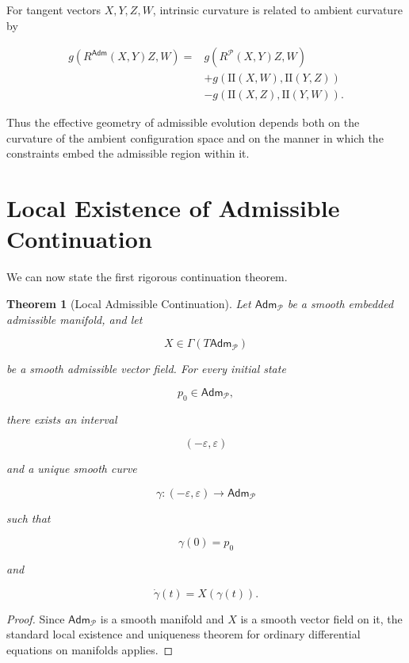 \documentclass[11pt,oneside]{book}
\numberwithin{equation}{chapter}
\theoremstyle{definition}
\theoremstyle{plain}
\newtheorem{theorem}[definition]{Theorem}
\newcommand{\Adm}{\mathsf{Adm}}
\begin{document}
For tangent vectors \(X,Y,Z,W\), intrinsic curvature is related to ambient
curvature by

\[
\begin{aligned}
g
\left(
R^{\Adm}(X,Y)Z,
W
\right)
={}&
g
\left(
R^{\mathcal P}(X,Y)Z,
W
\right)
\\
&
+
g
\left(
\mathrm{II}(X,W),
\mathrm{II}(Y,Z)
\right)
\\
&
-
g
\left(
\mathrm{II}(X,Z),
\mathrm{II}(Y,W)
\right).
\end{aligned}
\]

Thus the effective geometry of admissible evolution depends both on the
curvature of the ambient configuration space and on the manner in which the
constraints embed the admissible region within it.

\section{Local Existence of Admissible Continuation}

We can now state the first rigorous continuation theorem.

\begin{theorem}[Local Admissible Continuation]

Let \(\Adm_{\mathcal P}\) be a smooth embedded admissible manifold, and let

\[
X\in\Gamma(T\Adm_{\mathcal P})
\]

be a smooth admissible vector field. For every initial state

\[
p_0\in\Adm_{\mathcal P},
\]

there exists an interval

\[
(-\varepsilon,\varepsilon)
\]

and a unique smooth curve

\[
\gamma:
(-\varepsilon,\varepsilon)
\longrightarrow
\Adm_{\mathcal P}
\]

such that

\[
\gamma(0)=p_0
\]

and

\[
\dot\gamma(t)
=
X(\gamma(t)).
\]

\end{theorem}

\begin{proof}

Since \(\Adm_{\mathcal P}\) is a smooth manifold and \(X\) is a smooth vector
field on it, the standard local existence and uniqueness theorem for
ordinary differential equations on manifolds applies.

\end{proof}
\end{document}
